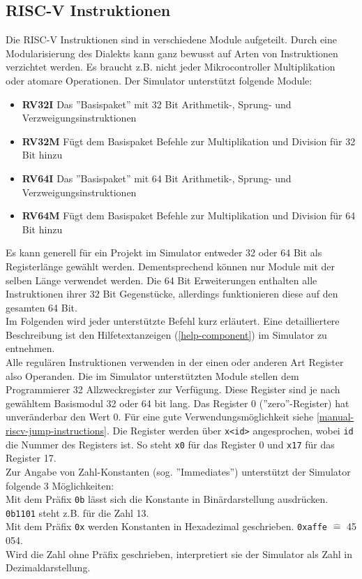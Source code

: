 {\subsection{RISC-V Instruktionen}
Die RISC-V Instruktionen sind in verschiedene Module aufgeteilt. Durch eine Modularisierung des Dialekts kann ganz bewusst auf Arten von Instruktionen verzichtet werden. Es braucht z.B. nicht jeder Mikrocontroller Multiplikation oder atomare Operationen. Der Simulator unterstützt folgende Module:\\
\begin{itemize}
	\item \textbf{RV32I} Das ''Basispaket'' mit 32 Bit Arithmetik-, Sprung- und Verzweigungsinstruktionen
	\item\textbf{ RV32M} Fügt dem Basispaket Befehle zur Multiplikation und Division für 32 Bit hinzu
	\item \textbf{RV64I} Das ''Basispaket'' mit 64 Bit Arithmetik-, Sprung- und Verzweigungsinstruktionen
	\item \textbf{RV64M} Fügt dem Basispaket Befehle zur Multiplikation und Division für 64 Bit hinzu
\end{itemize}
Es kann generell für ein Projekt im Simulator entweder 32 oder 64 Bit als Registerlänge gewählt werden. Dementsprechend können nur Module mit der selben Länge verwendet werden. Die 64 Bit Erweiterungen enthalten alle Instruktionen ihrer 32 Bit Gegenstücke, allerdings funktionieren diese auf den gesamten 64 Bit.\\
Im Folgenden wird jeder unterstützte Befehl kurz erläutert. Eine detailliertere Beschreibung ist den Hilfetextanzeigen (\autoref{help-component}) im Simulator zu entnehmen.\\

Alle regulären Instruktionen verwenden in der einen oder anderen Art Register also Operanden. Die im Simulator unterstützten Module stellen dem Programmierer 32 Allzweckregister zur Verfügung. Diese Register sind je nach gewähltem Basismodul 32 oder 64 bit lang. Das Register 0 (''zero''-Register) hat unveränderbar den Wert 0. Für eine gute Verwendungsmöglichkeit siehe \autoref{manual-riscv-jump-instructions}. Die Register werden über \texttt{x<id>} angesprochen, wobei \texttt{id} die Nummer des Registers ist. So steht \texttt{x0} für das Register 0 und \texttt{x17} für das Register 17.\\
Zur Angabe von Zahl-Konstanten (sog. ''Immediates'') unterstützt der Simulator folgende 3 Möglichkeiten:\\
Mit dem Präfix \texttt{0b} lässt sich die Konstante in Binärdarstellung ausdrücken. \texttt{0b1101} steht z.B. für die Zahl 13.\\
Mit dem Präfix \texttt{0x} werden Konstanten in Hexadezimal geschrieben. \texttt{0xaffe} $\widehat{=}$ 45 054.\\
Wird die Zahl ohne Präfix geschrieben, interpretiert sie der Simulator als Zahl in Dezimaldarstellung.

}
